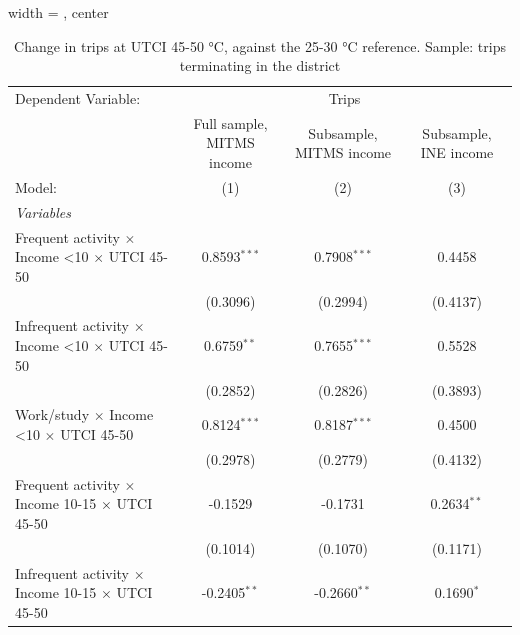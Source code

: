 
\begin{table}[htbp]
   \caption{\label{table_models_abc_terminating_45-50} Change in trips at UTCI 45-50 °C, against the 25-30 °C reference. Sample: trips terminating in the district}
   \centering
   \small
   \begin{adjustbox}{width = \textwidth, center}
      \begin{tabular}{lccc}
         \tabularnewline \midrule \midrule
         Dependent Variable: & \multicolumn{3}{c}{Trips}\\
                                                                         & Full sample, MITMS income & Subsample, MITMS income & Subsample, INE income \\   
         Model:                                                          & (1)                       & (2)                     & (3)\\  
         \midrule
         \emph{Variables}\\
         Frequent activity $\times$ Income <10 $\times$ UTCI 45-50       & 0.8593$^{***}$            & 0.7908$^{***}$          & 0.4458\\   
                                                                         & (0.3096)                  & (0.2994)                & (0.4137)\\   
         Infrequent activity $\times$ Income <10 $\times$ UTCI 45-50     & 0.6759$^{**}$             & 0.7655$^{***}$          & 0.5528\\   
                                                                         & (0.2852)                  & (0.2826)                & (0.3893)\\   
         Work/study $\times$ Income <10 $\times$ UTCI 45-50              & 0.8124$^{***}$            & 0.8187$^{***}$          & 0.4500\\   
                                                                         & (0.2978)                  & (0.2779)                & (0.4132)\\   
         Frequent activity $\times$ Income 10-15 $\times$ UTCI 45-50     & -0.1529                   & -0.1731                 & 0.2634$^{**}$\\   
                                                                         & (0.1014)                  & (0.1070)                & (0.1171)\\   
         Infrequent activity $\times$ Income 10-15 $\times$ UTCI 45-50   & -0.2405$^{**}$            & -0.2660$^{**}$          & 0.1690$^{*}$\\   

\end{tabular}
\end{adjustbox}
\end{table}
